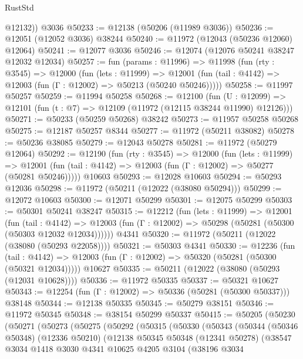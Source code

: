 \begin{lexlean}{RustStd}
\begin{coremodule}
        @12132))
    @3036
@50233 := @12138 (@50206 (@11989 @3036))
@50236 := @12051 (@12052 @3036) @38244
@50240 := @11972 (@12043 (@50236 @12060) @12064)
@50241 := @12077 @3036
@50246 := @12074 (@12076 @50241 @38247 @12032 @12034)
@50257 := fun (params : @11996) =>
  @11998
    (fun (rty : @3545) =>
    @12000
      (fun (lets : @11999) =>
      @12001 (fun (tail : @4142) => @12003 (fun (Γ : @12002) => @50213 (@50240 @50246)))))
@50258 := @11997 @50257
@50259 := @11994 @50258
@50268 := @12100
    (fun (U : @12099) => @12101 (fun (t : @7) => @12109 (@11972 (@12115 @38244 @11990) @12126)))
@50271 := @50233 (@50259 @50268) @38242
@50273 := @11957 @50258 @50268
@50275 := @12187 @50257 @8344
@50277 := @11972 (@50211 @38082)
@50278 := @50236 @38085
@50279 := @12043 @50278
@50281 := @11972 (@50279 @12064)
@50292 := @12190
    (fun (rty : @3545) =>
    @12000
      (fun (lets : @11999) =>
      @12001 (fun (tail : @4142) => @12003 (fun (Γ : @12002) => @50277 (@50281 @50246)))))
    @10603
@50293 := @12028 @10603
@50294 := @50293 @12036
@50298 := @11972 (@50211 (@12022 (@38080 @50294)))
@50299 := @12072 @10603
@50300 := @12071 @50299
@50301 := @12075 @50299
@50303 := @50301 @50241 @38247
@50315 := @12212
    (fun (lets : @11999) =>
    @12001
      (fun (tail : @4142) =>
      @12003 (fun (Γ : @12002) => @50298 (@50281 (@50300 (@50303 @12032 @12034))))))
    @4341
@50320 := @11972 (@50211 (@12022 (@38080 (@50293 @22058))))
@50321 := @50303 @4341
@50330 := @12236
    (fun (tail : @4142) => @12003 (fun (Γ : @12002) => @50320 (@50281 (@50300 (@50321 @12034)))))
    @10627
@50335 := @50211 (@12022 (@38080 (@50293 (@12031 @10628))))
@50336 := @11972 @50335
@50337 := @50321 @10627
@50343 := @12254 (fun (Γ : @12002) => @50336 (@50281 (@50300 @50337))) @38148
@50344 := @12138 @50335
@50345 := @50279 @38151
@50346 := @11972 @50345
@50348 := @38154 @50299 @50337
@50415 := @50205
    (@50230
      (@50271
        (@50273
          (@50275
            (@50292
              (@50315
                (@50330
                  (@50343
                    (@50344
                      (@50346 @50348)
                      (@12336 @50210)
                      (@12138
                        @50345
                        @50348
                        (@12341 @50278)
                        (@38547
                          @3034
                          @1418
                          @3030
                          @4341
                          @10625
                          @4205
                          @3104
                          (@38196
                            @3034

\end{coremodule}
\end{lexlean}
